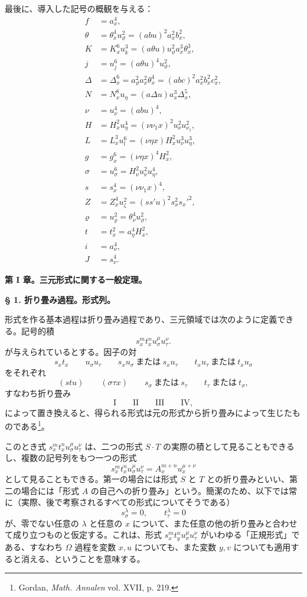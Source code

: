 \documentclass[11pt]{jlreq}
\begin{document}
最後に、導入した記号の概観を与える：
\begin{align*}
f&=a_x^4,\\
\theta&=\theta_x^4u_\vartheta^2=(abu)^2a_x^2b_x^2,\\
K&=K_x^6u_k^3=(a\theta u)u_\vartheta^2a_x^3\theta_x^3,\\
j&=u_j^6=(a\theta u)^4u_\vartheta^2,\\
\Delta&=\Delta_x^6=a_\vartheta^2a_x^2\theta_x^4=(abc)^2a_x^2b_x^2c_x^2,\\
N&=N_x^8u_\eta=(a\Delta u)a_x^3\Delta_x^5,\\
\nu&=u_\nu^4=(abu)^4,\\
H&=H_x^2u_\eta^4=(\nu\nu_1x)^2u_\nu^2u_{\nu_1}^2,\\
L&=L_x^3u_l^6=(\nu\eta x)H_x^2u_\nu^3u_\eta^3,\\
g&=g_x^6=(\nu\eta x)^4H_x^2,\\
\sigma&=u_\sigma^6=H_\nu^2u_\nu^2u_\eta^4,\\
s&=s_x^4=(\nu\nu_1x)^4,\\
Z&=Z_x^4u_\zeta^2=(ss'u)^2s_x^2s_x'^2,\\
\varrho&=u_\varrho^2=\theta_\nu^4u_\vartheta^2,\\
t&=t_x^2=a_\eta^4H_x^2,\\
i&=a_\nu^4,\\
J&=s_\nu^4.
\end{align*}

\begin{center}
{\Large\bfseries 第 I 章。\quad 三元形式に関する一般定理。}
\end{center}

\begin{center}
\textbf{§ 1. \quad 折り畳み過程。\quad 形式列。}
\end{center}

形式を作る基本過程は折り畳み過程であり、三元領域では次のように定義できる。記号的積
\[
s_x^m t_x^n u_\sigma^\mu u_\tau^\nu .
\]
が与えられているとする。因子の対
\[
s_xt_x\qquad u_\sigma u_\tau\qquad s_xu_\sigma\ \text{または}\ s_xu_\tau
\qquad t_xu_\tau\ \text{または}\ t_xu_\sigma
\]
をそれぞれ
\[
(stu)\qquad (\sigma\tau x)\qquad s_\sigma\ \text{または}\ s_\tau
\qquad t_\tau\ \text{または}\ t_\sigma,
\]
すなわち折り畳み
\[
\text{I}\qquad\text{II}\qquad\text{III}\qquad\text{IV},
\]
によって置き換えると、得られる形式は元の形式から折り畳みによって生じたものである\footnote{Gordan, \emph{Math. Annalen} vol. XVII, p. 219.}。

このとき式 $s_x^m t_x^n u_\sigma^\mu u_\tau^\nu$ は、二つの形式 $S\cdot T$ の実際の積として見ることもできるし、複数の記号列をもつ一つの形式
\[
s_x^m t_x^n u_\sigma^\mu u_\tau^\nu=A_x^{m+n}u_x^{\mu+\nu}
\]
として見ることもできる。第一の場合には形式 $S$ と $T$ との折り畳みといい、第二の場合には「形式 $A$ の自己への折り畳み」という。簡潔のため、以下では常に（実際、後で考察されるすべての形式についてそうである）
\[
\tag{a}
s_\sigma^\lambda=0,\qquad t_\tau^\lambda=0
\]
が、零でない任意の $\lambda$ と任意の $x$ について、また任意の他の折り畳みと合わせて成り立つものと仮定する。これは、形式 $s_x^m t_y^n u_\sigma^\mu u_\tau^\nu$ がいわゆる「正規形式」である、すなわち $\Omega$ 過程を変数 $x,u$ についても、また変数 $y,v$ についても適用すると消える、ということを意味する。
\end{document}
